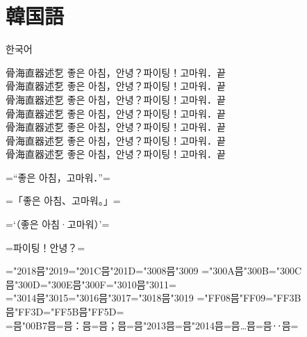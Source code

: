 \documentclass{ujarticle}
\begin{document}
\section{韓国語}
\upkorgtb 한국어

\upkorrml 骨海直器述乭 좋은 아침，안녕？파이팅！고마워．끝\\
\upkorrmm 骨海直器述乭 좋은 아침，안녕？파이팅！고마워．끝\\
\upkorrmb 骨海直器述乭 좋은 아침，안녕？파이팅！고마워．끝\\
\upkorgtm 骨海直器述乭 좋은 아침，안녕？파이팅！고마워．끝\\
\upkorgtb 骨海直器述乭 좋은 아침，안녕？파이팅！고마워．끝\\
\upkorgte 骨海直器述乭 좋은 아침，안녕？파이팅！고마워．끝\\
\upkorgth 骨海直器述乭 좋은 아침，안녕？파이팅！고마워．끝\\

\upkorrmm

=“좋은 아침，고마워．”=

=「좋은 아침、고마워。」=

=‘（좋은 아침·고마워）’=

=파이팅！안녕？=

=\kchar"2018믐\kchar"2019=\kchar"201C믐\kchar"201D=\kchar"3008믐\kchar"3009%
=\kchar"300A믐\kchar"300B=\kchar"300C믐\kchar"300D=\kchar"300E믐\kchar"300F=\kchar"3010믐\kchar"3011=\\
=\kchar"3014믐\kchar"3015=\kchar"3016믐\kchar"3017=\kchar"3018믐\kchar"3019%
=\kchar"FF08믐\kchar"FF09=\kchar"FF3B믐\kchar"FF3D=\kchar"FF5B믐\kchar"FF5D=\\
=믐\kchar"00B7믐=믐：믐=믐；믐=믐\kchar"2013믐=믐\kchar"2014믐=믐…믐=믐‥믐=
\end{document}
